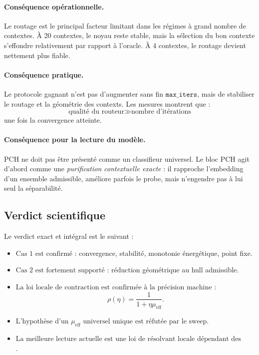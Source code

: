 \paragraph{Conséquence opérationnelle.}
Le routage est le principal facteur limitant dans les régimes à grand nombre de contextes.
À 20 contextes, le noyau reste stable, mais la sélection du bon contexte s’effondre relativement par rapport à l’oracle.
À 4 contextes, le routage devient nettement plus fiable.

\paragraph{Conséquence pratique.}
Le protocole gagnant n’est pas d’augmenter sans fin \(\texttt{max\_iters}\), mais de stabiliser le routage et la géométrie des contexts.
Les mesures montrent que :
\[
\text{qualité du routeur} \gg \text{nombre d’itérations}
\]
une fois la convergence atteinte.

\paragraph{Conséquence pour la lecture du modèle.}
PCH ne doit pas être présenté comme un classifieur universel.
Le bloc PCH agit d’abord comme une \emph{purification contextuelle exacte} :
il rapproche l’embedding d’un ensemble admissible, améliore parfois le probe, mais n’engendre pas à lui seul la séparabilité.

\subsection{Verdict scientifique}

Le verdict exact et intégral est le suivant :

\begin{itemize}
    \item \(\boxed{\text{Cas 1 est confirmé}}\) : convergence, stabilité, monotonie énergétique, point fixe.
    \item \(\boxed{\text{Cas 2 est fortement supporté}}\) : réduction géométrique au hull admissible.
    \item \(\boxed{\text{La loi locale de contraction est confirmée à la précision machine}}\) :
    \[
    \rho(\eta)=\frac{1}{1+\eta\mu_{\mathrm{eff}}}.
    \]
    \item \(\boxed{\text{L’hypothèse d’un } \mu_{\mathrm{eff}} \text{ universel unique est réfutée par le sweep}}\).
    \item \(\boxed{\text{La meilleure lecture actuelle est une loi de résolvant locale dépendant des hyperparamètres}}\).
\end{itemize}

